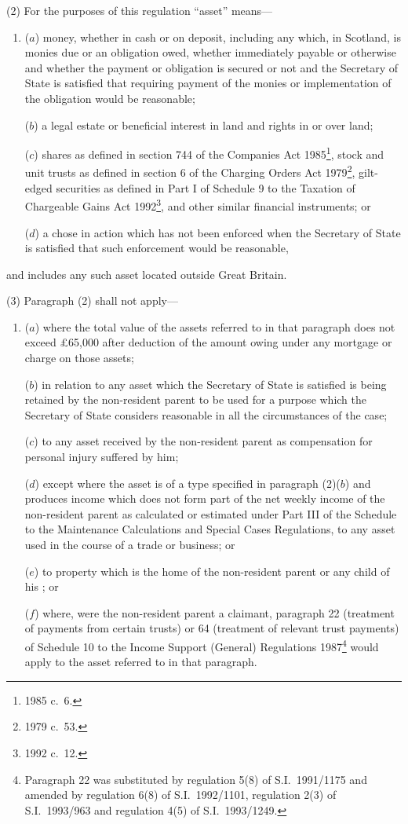 \documentclass[12pt,a4paper]{article}
\begin{document}
(2) For the purposes of this regulation “asset” means—
\begin{enumerate}\item[]
($a$) money, whether in cash or on deposit, including any which, in Scotland, is monies due or an obligation owed, whether immediately payable or otherwise and whether the payment or obligation is secured or not and the Secretary of State is satisfied that requiring payment of the monies or implementation of the obligation would be reasonable;

($b$) a legal estate or beneficial interest in land and rights in or over land;

($c$) shares as defined in section 744 of the Companies Act 1985\footnote{1985 c.\ 6.}, stock and unit trusts as defined in section 6 of the Charging Orders Act 1979\footnote{1979 c.\ 53.}, gilt-edged securities as defined in Part I of Schedule 9 to the Taxation of Chargeable Gains Act 1992\footnote{1992 c.\ 12.}, and other similar financial instruments; or

($d$) a chose in action which has not been enforced when the Secretary of State is satisfied that such enforcement would be reasonable,
\end{enumerate}
and includes any such asset located outside Great Britain.

(3) Paragraph (2) shall not apply—
\begin{enumerate}\item[]
($a$) where the total value of the assets referred to in that paragraph does not exceed £65,000 after deduction of the amount owing under any mortgage or charge on those assets;

($b$) in relation to any asset which the Secretary of State is satisfied is being retained by the non-resident parent to be used for a purpose which the Secretary of State considers reasonable in all the circumstances of the case;

($c$) to any asset received by the non-resident parent as compensation for personal injury suffered by him;

($d$) 
except where the asset is of a type specified in paragraph (2)($b$)  and produces income which does not form part of the net weekly income of the non-resident parent as calculated or estimated under Part III of the Schedule to the Maintenance Calculations and Special Cases Regulations,  %
to any asset used in the course of a trade or business; or

($e$) to property which is the home of the non-resident parent or any child of his%
%
; or

    ($f$) 
    where, were the non-resident parent a claimant, paragraph 22 (treatment of payments from certain trusts) or 64 (treatment of relevant trust payments) of Schedule 10 to the Income Support (General) Regulations 1987\footnote{Paragraph 22 was substituted by regulation 5(8) of S.I.\ 1991/1175 and amended by regulation 6(8) of S.I.\ 1992/1101, regulation 2(3) of S.I.\ 1993/963 and regulation 4(5) of S.I.\ 1993/1249.} would apply to the asset referred to in that paragraph.
\end{enumerate}
\end{document}
